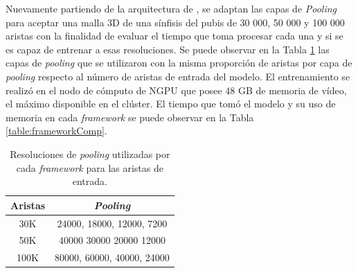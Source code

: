 Nuevamente partiendo de la arquitectura de , se adaptan las capas de \textit{Pooling} para aceptar una malla 3D de una sínfisis del pubis de 30 000, 50 000 y 100 000 aristas con la finalidad de evaluar el tiempo que toma procesar cada una y si se es capaz de entrenar a esas resoluciones. Se puede observar en la Tabla \ref{table:poolingResPerEdge} las capas de \textit{pooling} que se utilizaron con la misma proporción de aristas por capa de \textit{pooling} respecto al número de aristas de entrada del modelo. El entrenamiento se realizó en el nodo de cómputo de NGPU  que posee 48 GB de memoria de vídeo, el máximo disponible en el clúster. El tiempo que tomó el modelo y su uso de memoria en cada \textit{framework} se puede observar en la Tabla \ref{table:frameworkComp}.

\begin{table}[h]
\centering
\begin{tabular}{|c|c|}
\hline
\rowcolor[HTML]{FFC702}
{Aristas} & \textit{{Pooling}} \\ \hline
30K & 24000, 18000, 12000, 7200 \\ \hline
50K & 40000 30000 20000 12000 \\ \hline
100K & 80000, 60000, 40000, 24000 \\ \hline
\end{tabular}
\caption[Resoluciones de pooling para cada framework]{Resoluciones de \textit{pooling} utilizadas por cada \textit{framework} para las aristas de entrada.}
\label{table:poolingResPerEdge}
\end{table}


\begin{table}[h]
\centering
{}
\caption[Comparativa de frameworks respecto a tiempo y espacio]{Comparativa en tiempo y espacio de los \textit{frameworks} para procesar una malla.}
\label{table:frameworkComp}
\end{table}

